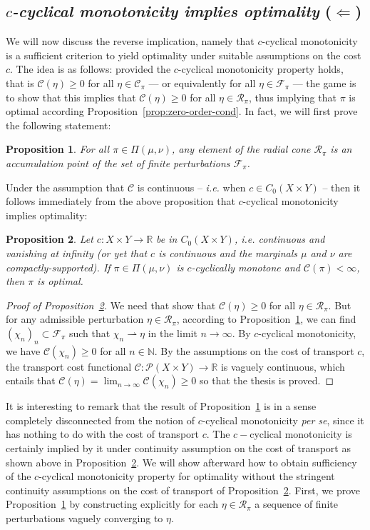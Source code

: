 \documentclass[leqno, 11pt, a4paper]{amsart}
\newtheorem{prop}{Proposition}
\theoremstyle{definition}
\newcommand{\cR}{\mathcal{R}}
\newcommand{\cC}{\mathcal{C}}
\newcommand{\R}{\mathbb{R}}
\newcommand{\C}{\mathscr{C}}
\newcommand{\N}{\mathbb{N}}
\newcommand{\cF}{\mathcal{F}}
\newcommand{\cP}{\mathcal{P}}
\newcommand{\wto}{\rightharpoonup}
\begin{document}
\subsection{\textit{$c$-cyclical monotonicity implies optimality} ($\Leftarrow$)}\label{sec:suf-ot}
We will now discuss the reverse implication, namely that $c$-cyclical monotonicity is a sufficient criterion to yield optimality under suitable assumptions on the cost $c$. The idea is as follows: provided the $c$-cyclical monotonicity property holds, that is $\C(\eta) \geq 0$ for all $\eta \in \cC_\pi$ --- or equivalently for all $\eta \in \cF_\pi$ --- the game is to show that this implies that $\C(\eta) \geq 0$ for all $\eta \in \cR_\pi$, thus implying that $\pi$ is optimal according Proposition~\ref{prop:zero-order-cond}. In fact, we will first prove the following statement:
\begin{prop}\label{prop:density}
	For all $\pi \in \Pi(\mu, \nu)$, any element of the radial cone $\cR_\pi$ is an accumulation point of the set of finite perturbations $\cF_\pi$.
\end{prop}
Under the assumption that $\C$ is continuous -- \textit{i.e.} when $c \in C_0(X \times Y)$ -- then it follows immediately from the above proposition that $c$-cyclical monotonicity implies optimality:
\begin{prop}\label{prop:sufficiency-cont}
	Let $c : X \times Y \to \R$ be in $C_0(X \times Y)$, \textit{i.e.} continuous and vanishing at infinity (or yet that $c$ is continuous and the marginals $\mu$ and $\nu$ are compactly-supported). If $\pi \in \Pi(\mu, \nu)$ is $c$-cyclically monotone and $\C(\pi)<\infty$, then $\pi$ is optimal.
\end{prop}
\begin{proof}[Proof of Proposition~\ref{prop:sufficiency-cont}]
	We need that show that $\C(\eta) \geq 0$ for all $\eta \in \cR_\pi$. But for any admissible perturbation $\eta \in \cR_\pi$, according to Proposition~\ref{prop:density}, we can find $(\chi_n)_n \subset \cF_\pi$ such that $\chi_n \wto \eta$ in the limit $n \to \infty$. By $c$-cyclical monotonicity, we have $\C(\chi_n) \geq 0$ for all $n \in \N$. By the assumptions on the cost of transport $c$, the transport cost functional $\C : \cP(X \times Y) \to \R$ is vaguely continuous, which entails that $\C(\eta) = \lim_{n \to \infty} \C(\chi_n) \geq 0$ so that the thesis is proved.
\end{proof}
It is interesting to remark that the result of Proposition~\ref{prop:density} is in a sense completely disconnected from the notion of $c$-cyclical monotonicity \textit{per se}, since it has nothing to do with the cost of transport $c$. The $c-$cyclical monotonicity is certainly implied by it under continuity assumption on the cost of transport as shown above in Proposition~\ref{prop:sufficiency-cont}. We will show afterward how to obtain sufficiency of the $c$-cyclical monotonicity property for optimality without the stringent continuity assumptions on the cost of transport of Proposition~\ref{prop:sufficiency-cont}. First, we prove Proposition~\ref{prop:density} by constructing explicitly for each $\eta \in \cR_\pi$ a sequence of finite perturbations vaguely converging to $\eta$.
\end{document}
